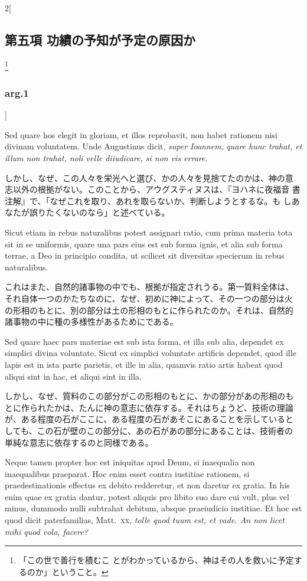 \documentclass[paper=a4paper,fontsize=10pt,jafontsize=9pt,titlepage]{jlreq}
\begin{document}
\begin{paracol}{2}[\subsection{第五項 功績の予知が予定の原因か}\footnote{「この世で善行を積むこ とがわかっているから、神はその人を救いに予定するのか」ということ。}\subsubsection{arg.1}]
\switchcolumn*


Sed
quare hos elegit in gloriam, et illos reprobavit, non habet rationem
nisi divinam voluntatem. Unde Augustinus dicit, {\itshape super Ioannem}, {\itshape quare
hunc trahat, et illum non trahat, noli velle diiudicare, si non vis
errare}.


\switchcolumn


しかし、なぜ、この人々を栄光へと選び、かの人々を見捨てたのかは、神の意
志以外の根拠がない。このことから、アウグスティヌスは、『ヨハネに夜福音
書注解』で、「なぜこれを取り、あれを取らないか、判断しようとするな。も
しあなたが誤りたくないのなら」と述べている。


\switchcolumn*


Sicut etiam in rebus naturalibus potest assignari ratio, cum
prima materia tota sit in se uniformis, quare una pars eius est sub
forma ignis, et alia sub forma terrae, a Deo in principio condita, ut
scilicet sit diversitas specierum in rebus naturalibus.


\switchcolumn


これはまた、自然的諸事物の中でも、根拠が指定されうる。第一質料全体は、
それ自体一つのかたちなのに、なぜ、初めに神によって、その一つの部分は火
の形相のもとに、別の部分は土の形相のもとに作られたのか。それは、自然的
諸事物の中に種の多様性があるためにである。


\switchcolumn*


Sed quare haec
pars materiae est sub ista forma, et illa sub alia, dependet ex simplici
divina voluntate. Sicut ex simplici voluntate artificis dependet, quod
ille lapis est in ista parte parietis, et ille in alia, quamvis ratio
artis habeat quod aliqui sint in hac, et aliqui sint in illa.


\switchcolumn


しかし、なぜ、質料のこの部分がこの形相のもとに、かの部分があの形相のも
とに作られたかは、たんに神の意志に依存する。それはちょうど、技術の理論
が、ある程度の石がここに、ある程度の石があそこにあることを示していると
しても、この石が壁のこの部分に、あの石があの部分にあることは、技術者の
単純な意志に依存するのと同様である。


\switchcolumn*


Neque
tamen propter hoc est iniquitas apud Deum, si inaequalia non
inaequalibus praeparat. Hoc enim esset contra iustitiae rationem, si
praedestinationis effectus ex debito redderetur, et non daretur ex
gratia. In his enim quae ex gratia dantur, potest aliquis pro libito suo
dare cui vult, plus vel minus, dummodo nulli subtrahat debitum, absque
praeiudicio iustitiae. Et hoc est quod dicit paterfamilias, Matt.~{\scshape xx},
{\itshape tolle quod tuum est, et vade. An non licet mihi quod volo, facere?}



\end{paracol}
\end{document}

